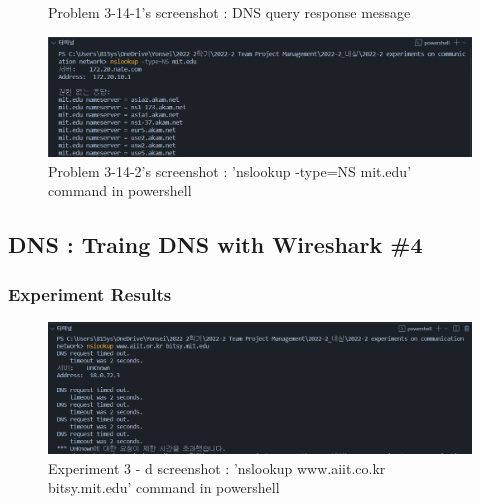 \begin{enumerate}[label=\bfseries Problem \arabic*:,leftmargin=*,labelindent=1em]
\begin{figure}[!h]
        		\caption{\footnotesize Problem 3-14-1's screenshot : DNS query response message}
        		\vspace{-10pt}
            \end{figure}
            \begin{figure}[!h]\centering
                \hspace{10mm} 
        		\includegraphics[width=.79\textwidth]{image/result_week01/Q3-e-2.png}
        		\caption{\footnotesize Problem 3-14-2's screenshot : 'nslookup -type=NS mit.edu' command in powershell}
        		\vspace{-10pt}
            \end{figure}
    \end{enumerate}
\subsection{DNS : Traing DNS with Wireshark \#4}
    \subsubsection*{Experiment Results}
         \vspace{-2mm}  
        \begin{figure}[!h]\centering
            \hspace{10mm} 
    		\includegraphics[width=.78\textwidth]{image/result_week01/Q3-f-0.png}
    		\caption{\footnotesize Experiment 3 - d screenshot : 'nslookup www.aiit.co.kr bitsy.mit.edu' command in powershell}
    		\vspace{-10pt}
        \end{figure}

